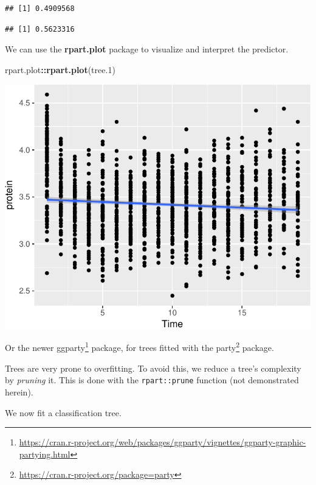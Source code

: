 \documentclass[]{book}
\newenvironment{Shaded}{\begin{snugshade}}{\end{snugshade}}
\newcommand{\CommentTok}[1]{\textcolor[rgb]{0.56,0.35,0.01}{\textit{#1}}}
\newcommand{\DataTypeTok}[1]{\textcolor[rgb]{0.13,0.29,0.53}{#1}}
\newcommand{\FloatTok}[1]{\textcolor[rgb]{0.00,0.00,0.81}{#1}}
\newcommand{\KeywordTok}[1]{\textcolor[rgb]{0.13,0.29,0.53}{\textbf{#1}}}
\newcommand{\NormalTok}[1]{#1}
\newcommand{\OperatorTok}[1]{\textcolor[rgb]{0.81,0.36,0.00}{\textbf{#1}}}
\newcommand{\StringTok}[1]{\textcolor[rgb]{0.31,0.60,0.02}{#1}}
\renewcommand{\href}[2]{#2\footnote{\url{#1}}}
\theoremstyle{definition}
\theoremstyle{definition}
\theoremstyle{definition}
\theoremstyle{remark}
\begin{document}
\begin{verbatim}
## [1] 0.4909568
\end{verbatim}

\begin{Shaded}
\end{Shaded}

\begin{verbatim}
## [1] 0.5623316
\end{verbatim}

We can use the \textbf{rpart.plot} package to visualize and interpret the predictor.

\begin{Shaded}
\begin{Highlighting}[]
\NormalTok{rpart.plot}\OperatorTok{::}\KeywordTok{rpart.plot}\NormalTok{(tree}\FloatTok{.1}\NormalTok{)}
\end{Highlighting}
\end{Shaded}

\includegraphics[width=0.5\linewidth]{Rcourse_files/figure-latex/unnamed-chunk-232-1}

Or the newer \href{https://cran.r-project.org/web/packages/ggparty/vignettes/ggparty-graphic-partying.html}{ggparty} package, for trees fitted with the \href{https://cran.r-project.org/package=party}{party} package.

Trees are very prone to overfitting.
To avoid this, we reduce a tree's complexity by \emph{pruning} it.
This is done with the \texttt{rpart::prune} function (not demonstrated herein).

We now fit a classification tree.
\end{document}
